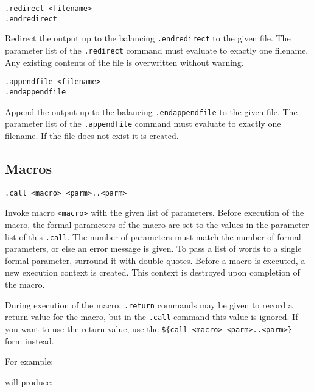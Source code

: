 \begin{verbatim}
.redirect <filename>
.endredirect
\end{verbatim}
\begin{desc}
Redirect the output up to the balancing \verb'.endredirect' to the
given file.  The parameter list of the \verb'.redirect' command
must evaluate to exactly one filename.  Any existing contents of the
file is overwritten without warning.
\end{desc}
\begin{verbatim}
.appendfile <filename>
.endappendfile
\end{verbatim}
\begin{desc}
Append the output up to the balancing \verb'.endappendfile' to the given
file. The parameter list of the \verb'.appendfile' command must evaluate
to exactly one filename. If the file does not exist it is created.
\end{desc}

\subsection{Macros}
\begin{verbatim}
.call <macro> <parm>..<parm>
\end{verbatim}
\begin{desc}
Invoke macro \verb+<macro>+ with the given list of parameters.
Before execution of the macro, the formal parameters of the macro
are set to the values in the parameter list of this \texttt{.call}.
The number of parameters must match the number of formal parameters,
or else an error message is given. To pass a list of words to a
single formal parameter, surround it with double quotes.  Before a
macro is executed, a new execution context is created. This context
is destroyed upon completion of the macro.

During execution of the macro, \verb+.return+ commands may be given
to record a return value for the macro, but in the \verb+.call+
command this value is ignored.  If you want to use the return value,
use the \verb+${call <macro> <parm>..<parm>}+ form instead.

For example:
\begin{showfile}

\end{showfile}
will produce:
\begin{showfile}

\end{showfile}
\end{desc}

